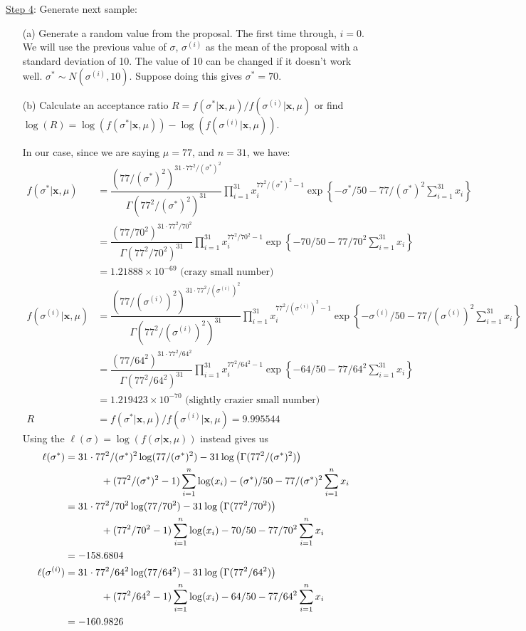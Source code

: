 \documentclass[11pt]{article}
\begin{document}
\uline{Step 4}: Generate next sample:
\begin{enumerate}
\item[(a)] Generate a random value from the proposal. The first time through, $i=0$. We will use the previous value of $\sigma$, $\sigma^{(i)}$ as the mean of the proposal with a standard deviation of 10. The value of 10 can be changed if it doesn't work well. $\sigma^*\sim N(\sigma^{(i)},10)$. Suppose doing this gives $\sigma^*= 70$.
\item[(b)]  Calculate an acceptance ratio  $R=f(\sigma^*|\boldsymbol{x},\mu)/f(\sigma^{(i)}|\boldsymbol{x},\mu)$ or find $\log(R)=\log(f(\sigma^*|\boldsymbol{x},\mu))-\log(f(\sigma^{(i)}|\boldsymbol{x},\mu)).$

In our case, since we are saying $\mu=77$, and $n=31$, we have:
\begin{align*}
f(\sigma^*|\boldsymbol{x},\mu)&=\dfrac{(77/(\sigma^*)^2)^{31\cdot 77^2/(\sigma^*)^2}}{\Gamma(77^2/(\sigma^*)^2)^{31}}\prod_{i=1}^{31}x_i^{77^2/(\sigma^*)^2-1}\exp\left\{-\sigma^*/50-77/(\sigma^*)^2\sum_{i=1}^{31}x_i\right\}\\
&=\dfrac{(77/70^2)^{31\cdot 77^2/70^2}}{\Gamma(77^2/70^2)^{31}}\prod_{i=1}^{31}x_i^{77^2/70^2-1}\exp\left\{-70/50-77/70^2\sum_{i=1}^{31}x_i\right\}\\
&=1.21888\times 10^{-69} \text{ (crazy small number)}\\
f(\sigma^{(i)}|\boldsymbol{x},\mu)&=\dfrac{(77/(\sigma^{(i)})^2)^{31\cdot 77^2/(\sigma^{(i)})^2}}{\Gamma(77^2/(\sigma^{(i)})^2)^{31}}\prod_{i=1}^{31}x_i^{77^2/(\sigma^{(i)})^2-1}\exp\left\{-\sigma^{(i)}/50-77/(\sigma^{(i)})^2\sum_{i=1}^{31}x_i\right\}\\
&=\dfrac{(77/64^2)^{31\cdot 77^2/64^2}}{\Gamma(77^2/64^2)^{31}}\prod_{i=1}^{31}x_i^{77^2/64^2-1}\exp\left\{-64/50-77/64^2\sum_{i=1}^{31}x_i\right\}\\
&=1.219423\times10^{-70} \text{ (slightly crazier small number)}\\
R&=f(\sigma^*|\boldsymbol{x},\mu)/f(\sigma^{(i)}|\boldsymbol{x},\mu)=9.995544
\end{align*}
Using the $\ell(\sigma)=\log\left(f(\sigma|\boldsymbol{x},\mu)\right)$ instead gives us 
\begin{align*}
\ell(\sigma^*)&=31\cdot77^2/(\sigma^*)^2\log(77/(\sigma^*)^2)-31\log\left(\Gamma(77^2/(\sigma^*)^2)\right)\\
&\hspace{.5in}+(77^2/(\sigma^*)^2-1)\sum_{i=1}^n\log(x_i)-(\sigma^*)/50-77/(\sigma^*)^2\sum_{i=1}^nx_i\\
&=31\cdot77^2/70^2\log(77/70^2)-31\log\left(\Gamma(77^2/70^2)\right)\\
&\hspace{.5in}+(77^2/70^2-1)\sum_{i=1}^n\log(x_i)-70/50-77/70^2\sum_{i=1}^nx_i\\
&=-158.6804\\
\ell(\sigma^{(i)})&=31\cdot77^2/64^2\log(77/64^2)-31\log\left(\Gamma(77^2/64^2)\right)\\
&\hspace{.5in}+(77^2/64^2-1)\sum_{i=1}^n\log(x_i)-64/50-77/64^2\sum_{i=1}^nx_i\\
&=-160.9826
\end{align*}


\end{enumerate}
\end{document}
